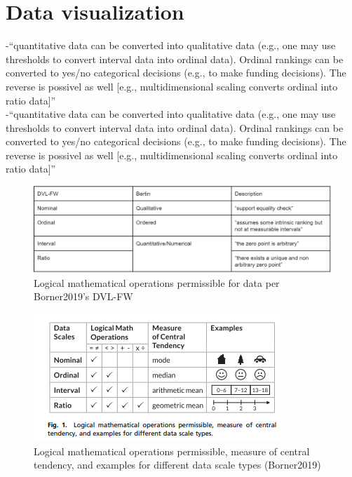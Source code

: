 \section{Data visualization}
-{\color{orange}“quantitative data can be converted into qualitative data (e.g., one may use thresholds to convert interval data into ordinal data). Ordinal rankings can be converted to yes/no categorical decisions (e.g., to make funding decisions). The reverse is possivel as well [e.g., multidimensional scaling converts ordinal into ratio data]”\cite{Borner2019}}\\
-{\color{orange}“quantitative data can be converted into qualitative data (e.g., one may use thresholds to convert interval data into ordinal data). Ordinal rankings can be converted to yes/no categorical decisions (e.g., to make funding decisions). The reverse is possivel as well [e.g., multidimensional scaling converts ordinal into ratio data]”\cite{Borner2019}}\\

\begin{figure}[H]
	\centering
	\includegraphics[width=.9\linewidth]{images/borner19_logical_operations.png}
	\caption{Logical mathematical operations permissible for data per Borner2019's DVL-FW}
	\label{fig:borner2019_logical_ops}
\end{figure}

\begin{figure}[H]
	\centering
	\includegraphics[width=.9\linewidth]{images/borner2019_figure1.png}
	\caption{Logical mathematical operations permissible, measure of central tendency, and examples for different data scale types (Borner2019)}
	\label{fig:borner2019_fig1}
\end{figure}

